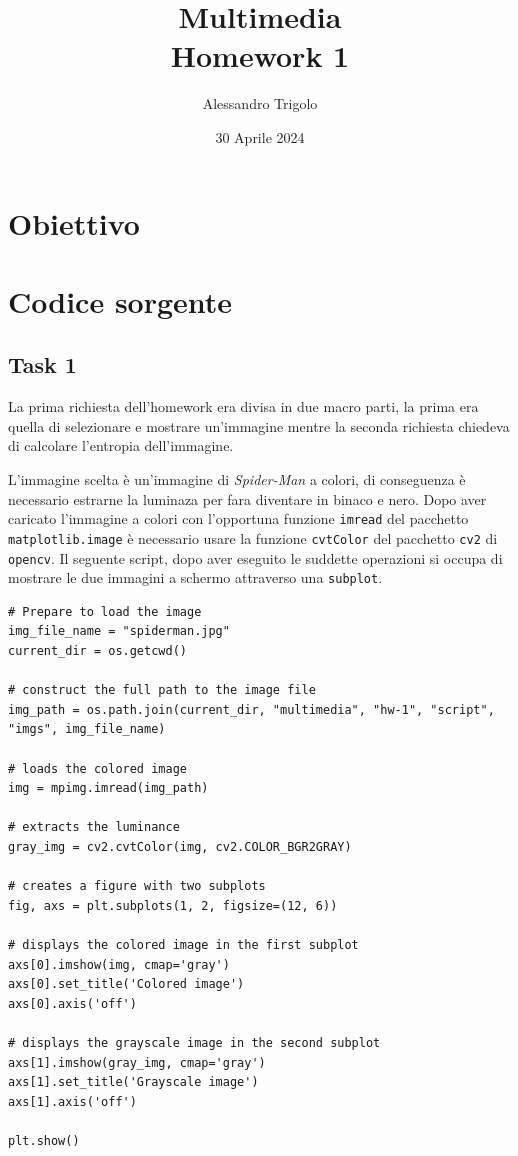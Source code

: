 \title{\vspace{160px} \textbf{\huge{Multimedia}} \\\vspace{17.5px} \LARGE{Homework 1}  \vspace{10px}}
\author{Alessandro Trigolo}
\date{30 Aprile 2024}



\maketitle\newpage




\section{Obiettivo}



\section{Codice sorgente}

\subsection*{Task 1}

La prima richiesta dell'homework era divisa in due macro parti, la prima era quella di selezionare e mostrare un'immagine mentre la seconda richiesta chiedeva di calcolare l'entropia dell'immagine.

L'immagine scelta è un'immagine di \textsl{Spider-Man} a colori, di conseguenza è necessario estrarne la luminaza per fara diventare in binaco e nero. Dopo aver caricato l'immagine a colori con l'opportuna funzione \texttt{imread} del pacchetto \texttt{matplotlib.image} è necessario usare la funzione \texttt{cvtColor} del pacchetto \texttt{cv2} di \texttt{opencv}. Il seguente script, dopo aver eseguito le suddette operazioni si occupa di mostrare le due immagini a schermo attraverso una \texttt{subplot}.

\begin{lstlisting}
# Prepare to load the image
img_file_name = "spiderman.jpg"
current_dir = os.getcwd()

# construct the full path to the image file
img_path = os.path.join(current_dir, "multimedia", "hw-1", "script", "imgs", img_file_name) 

# loads the colored image
img = mpimg.imread(img_path) 

# extracts the luminance
gray_img = cv2.cvtColor(img, cv2.COLOR_BGR2GRAY)

# creates a figure with two subplots
fig, axs = plt.subplots(1, 2, figsize=(12, 6))

# displays the colored image in the first subplot
axs[0].imshow(img, cmap='gray')
axs[0].set_title('Colored image')
axs[0].axis('off')

# displays the grayscale image in the second subplot
axs[1].imshow(gray_img, cmap='gray')
axs[1].set_title('Grayscale image')
axs[1].axis('off')

plt.show()
\end{lstlisting}


